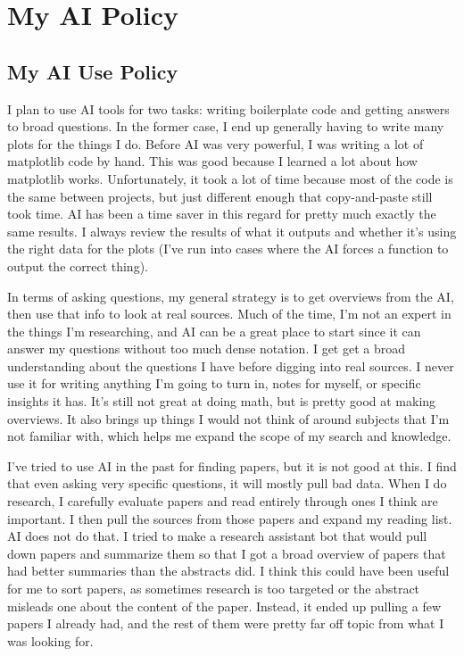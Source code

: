 
\section{My AI Policy}

\subsection{My AI Use Policy}

I plan to use AI tools for two tasks: writing boilerplate code and getting answers to broad questions. In the former case, I end up generally having to write many plots for the things I do. Before AI was very powerful, I was writing a lot of matplotlib code by hand. This was good because I learned a lot about how matplotlib works. Unfortunately, it took a lot of time because most of the code is the same between projects, but just different enough that copy-and-paste still took time. AI has been a time saver in this regard for pretty much exactly the same results. I always review the results of what it outputs and whether it's using the right data for the plots (I've run into cases where the AI forces a function to output the correct thing).

In terms of asking questions, my general strategy is to get overviews from the AI, then use that info to look at real sources. Much of the time, I'm not an expert in the things I'm researching, and AI can be a great place to start since it can answer my questions without too much dense notation. I get get a broad understanding about the questions I have before digging into real sources. I never use it for writing anything I'm going to turn in, notes for myself, or specific insights it has. It's still not great at doing math, but is pretty good at making overviews. It also brings up things I would not think of around subjects that I'm not familiar with, which helps me expand the scope of my search and knowledge.

I've tried to use AI in the past for finding papers, but it is not good at this. I find that even asking very specific questions, it will mostly pull bad data. When I do research, I carefully evaluate papers and read entirely through ones I think are important. I then pull the sources from those papers and expand my reading list. AI does not do that. I tried to make a research assistant bot that would pull down papers and summarize them so that I got a broad overview of papers that had better summaries than the abstracts did. I think this could have been useful for me to sort papers, as sometimes research is too targeted or the abstract misleads one about the content of the paper. Instead, it ended up pulling a few papers I already had, and the rest of them were pretty far off topic from what I was looking for.

